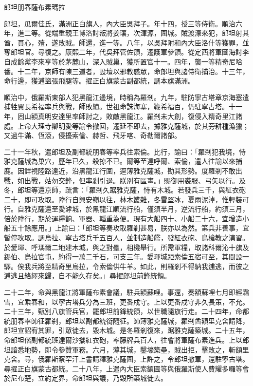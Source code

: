 
\begin{pinyinscope}
郎坦朋春薩布素瑪拉

郎坦，瓜爾佳氏，滿洲正白旗人，內大臣吳拜子。年十四，授三等侍衛。順治六年，進二等。從端重親王博洛討叛將姜瓖，次渾源，圍城。賊渡濠來犯，郎坦射其酋，貫心，殪，遂敗賊。師還，進一等。八年，以吳拜附和內大臣洛什等獲罪，並奪郎坦官。尋復之。康熙二年，代吳拜管佐領，遷護軍參領。從定西將軍圖海討李自成餘黨李來亨等於茅麓山，深入賊巢，獲所置官十一。四年，襲一等精奇尼哈番。十二年，京師有陳三道者，設壇以邪教惑眾，命郎坦與諸侍衛捕治。十三年，命行邊，獲逋盜張飛腿等。擢正白旗蒙古副都統，調本旗滿洲。

順治中，俄羅斯東部人犯黑龍江邊境，時稱為羅剎。九年，駐防寧古塔章京海塞遣捕牲翼長希福率兵與戰，師敗績。世祖命誅海塞，鞭希福百，仍駐寧古塔。十一年，固山額真明安達里率師討之，敗敵黑龍江。羅剎未大創，復侵入精奇里江諸處。上命大理寺卿明愛等諭令撤回，遷延不即去，據雅克薩城，於其旁耕種漁獵；又過牛滿、恆滾，侵擾索倫、赫哲、飛牙喀、奇勒爾諸部。

二十一年秋，遣郎坦及副都統朋春等率兵往索倫。比行，諭曰：「羅剎犯我境，恃雅克薩城為巢穴，歷年已久，殺掠不已。爾等至達呼爾、索倫，遣人往諭以來捕鹿。因詳視陸路遠近，沿黑龍江行圍，逕薄雅克薩城，勘其形勢。度羅剎不敢出戰，如出戰，姑勿交鋒，但率剎引退。朕別有區畫。」賜御用裘服、弓矢以行。及冬，郎坦等還京師，疏言：「羅剎久踞雅克薩，恃有木城。若發兵三千，與紅衣砲二十，即可攻取。陸行自興安嶺以往，林木叢雜，冬雪堅冰，夏雨泥淖，惟輕裝可行。自雅克薩還至愛滹城，於黑龍江順流行船，僅須半月，逆流行船，約須三月，倍於陸行，期於運糧餉、軍器、輜重為便。現有大船四十、小船二十六，宜增造小船五十餘應用。」上諭曰：「郎坦等奏攻取羅剎甚易，朕亦以為然。第兵非善事，宜暫停攻取。調烏拉、寧古塔兵千五百人，並制造船艦，發紅衣砲、鳥槍教之演習。於愛琿、呼瑪爾二地建木城，與之對壘，相機舉行。所需軍糧，取諸科爾沁十旗及錫伯、烏拉官屯，約得一萬二千石，可支三年。愛琿城距索倫五宿可至，其間設一驛。俟我兵將至精奇里烏拉，令索倫供牛羊。如此，則羅剎不得納我逋逃，而彼之逋逃且絡繹來歸，自不能久存矣。」尋擢郎坦前鋒統領。

二十二年，命與黑龍江將軍薩布素會議，駐兵額蘇哩。事還，奏額蘇哩七月即經霜雪，宜乘春和，以寧古塔兵分為三班，更番戍守。上以更番戍守非久長策，不允。二十三年，甄別八旗管兵官，罷郎坦前鋒統領，以世職隨旗行走。二十四年，命都統朋春率師征羅剎，郎坦以副都統銜隨征。師薄雅克薩城，羅剎酋額里克舍請降，郎坦宣詔宥其罪，引眾徙去，毀木城。是冬羅剎復來，踞雅克薩築城。二十五年，命郎坦偕副都統班達爾沙攜紅衣砲，率藤牌兵百人，往會將軍薩布素進兵。上以郎坦諳悉地勢，即令參贊軍務。六月，薄其城，鑿壕築壘，賊出拒，擊敗之，斬額里克舍。尋，俄羅斯察罕汗上書請釋雅克薩圍，上許之，令郎坦撤軍，還駐寧古塔。尋擢正白旗蒙古都統。二十八年，上遣內大臣索額圖等與俄羅斯使人費耀多囉等會於尼布楚，立約定界，命郎坦與議，乃毀所築城徙去。


\end{pinyinscope}
